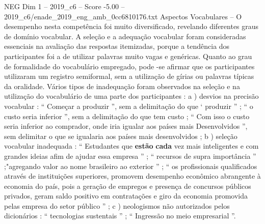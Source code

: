 \begin{textsample}{NEG Dim 1 – 2019\_c6 – Score -5.00 – 2019\_c6/enade\_2019\_eng\_amb\_0cc6810176.txt}
Aspectos Vocabulares – O desempenho nesta competência foi muito diversificado, revelando diferentes graus de domínio vocabular.
A seleção e a adequação vocabular foram consideradas essenciais na avaliação das respostas itemizadas, porque a tendência dos participantes foi a de utilizar palavras muito vagas e genéricas.
Quanto ao grau de formalidade do vocabulário empregado, pode -se afirmar que os participantes utilizaram um registro semiformal, sem a utilização de gírias ou palavras típicas da oralidade.
Vários tipos de inadequação foram observados na seleção e na utilização do vocabulário de uma parte dos participantes : a ) desvios na precisão vocabular : “ Começar a produzir ”, sem a delimitação do que ‘ produzir ” ; “ o custo seria inferior ”, sem a delimitação do que tem custo ; “ Com isso o custo seria inferior ao comprador, onde iria igualar aos países mais Desenvolvidos ”, sem delimitar o que se igualaria aos países mais desenvolvidos ; b ) seleção vocabular inadequada : “ Estudantes que \textbf{estão} \textbf{cada} vez mais inteligentes e com grandes ideias afim de ajudar essa empresa ” ; “ recursos de supra importância ” ;"agregando valor ao nome brasileiro ao exterior ” ; “ os profissionais qualificados através de instituições superiores, promovem desempenho econômico abrangente à economia do país, pois a geração de empregos e presença de concursos públicos privados, geram saldo positivo em contratações e giro da economia promovida pelas empresa do setor público ” ; c ) neologismos não autorizados pelos dicionários : “ tecnologias sustentais ” ; “ Ingressão no meio empresarial ”.

\end{textsample}
